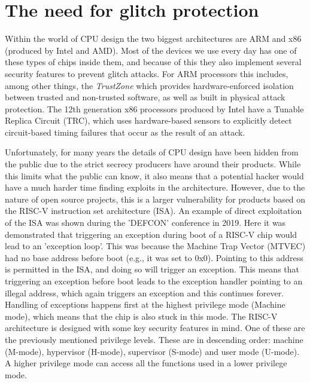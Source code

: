 
\section{The need for glitch protection}
\label{sec:need}

Within the world of CPU design the two biggest architectures are ARM and x86 (produced by Intel and AMD). Most of the devices we use every day has one of these types of chips inside them, and because of this they also implement several security features to prevent glitch attacks. For ARM processors this includes, among other things, the \textit{TrustZone} which provides hardware-enforced isolation between trusted and non-trusted software, as well as built in physical attack protection\cite{arm}. The 12th generation x86 processors produced by Intel have a Tunable Replica Circuit (TRC), which uses hardware-based sensors to explicitly detect circuit-based timing failures that occur as the result of an attack\cite{intel}.  

Unfortunately, for many years the details of CPU design have been hidden from the public due to the strict secrecy producers have around their products\cite{riscv_wiki}. While this limits what the public can know, it also means that a potential hacker would have a much harder time finding exploits in the architecture. However, due to the nature of open source projects, this is a larger vulnerability for products based on the RISC-V instruction set architecture (ISA). An example of direct exploitation of the ISA was shown during the 'DEFCON' conference in 2019\cite{isa_exploit}. Here it was demonstrated that triggering an exception during boot of a RISC-V chip would lead to an 'exception loop'. This was because the Machine Trap Vector (MTVEC) had no base address before boot (e.g., it was set to 0x0). Pointing to this address is permitted in the ISA, and doing so will trigger an exception. This means that triggering an exception before boot leads to the exception handler pointing to an illegal address, which again triggers an exception and this continues forever. Handling of exceptions happens first at the highest privilege mode (Machine mode), which means that the chip is also stuck in this mode. The RISC-V architecture is designed with some key security features in mind. One of these are the previously mentioned privilege levels. These are in descending order: machine (M-mode), hypervisor (H-mode), supervisor (S-mode) and user mode (U-mode). A higher privilege mode can access all the functions used in a lower privilege mode\cite{source2}.

